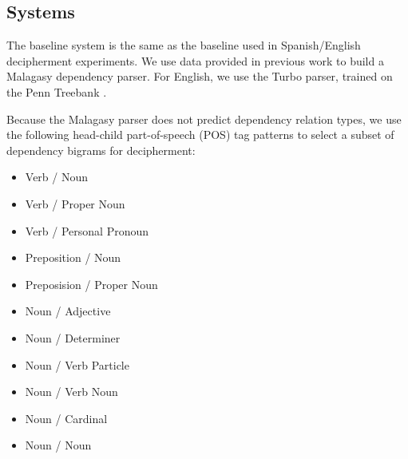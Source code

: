 \subsection{Systems}
The baseline system is the same as the baseline used in Spanish/English decipherment experiments. We use data provided in previous work \cite{dou-vaswani-knight:2014:EMNLP2014} to build a Malagasy dependency parser. For English, we use the Turbo parser, trained on the Penn Treebank \cite{TurboParser}.  

Because the Malagasy parser does not predict dependency relation types, we use the following head-child part-of-speech (POS) tag patterns to select a subset of dependency bigrams for decipherment: 


\begin{itemize}
\item Verb / Noun
\item Verb / Proper Noun
\item Verb / Personal Pronoun
\item Preposition / Noun
\item Preposision / Proper Noun
\item Noun / Adjective
\item Noun / Determiner
\item Noun / Verb Particle
\item Noun / Verb Noun %
\item Noun / Cardinal
\item Noun / Noun
\end{itemize}

%
%

